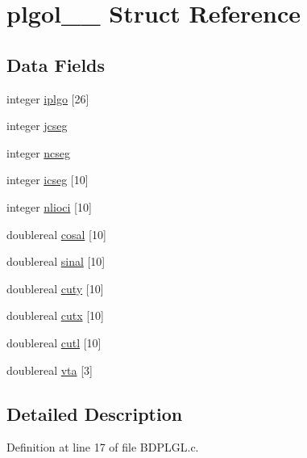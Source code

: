 \hypertarget{structplgol__1__}{}\section{plgol\+\_\+\_\+ Struct Reference}
\label{structplgol__1__}
\subsection*{Data Fields}
\begin{DoxyCompactItemize}
\item 
integer \hyperlink{structplgol__1___a32a2e59eb008ef43088590b0d5d9bad7}{iplgo} \mbox{[}26\mbox{]}
\item 
integer \hyperlink{structplgol__1___aa429c3e8a2db853c48bb7460e34ea585}{jcseg}
\item 
integer \hyperlink{structplgol__1___af13a26e581bc7e4c2933b38cf4f3ad45}{ncseg}
\item 
integer \hyperlink{structplgol__1___a84f8c270e0daa259175f2a20c4a2c7d7}{icseg} \mbox{[}10\mbox{]}
\item 
integer \hyperlink{structplgol__1___a2e768cef3d4a9a2ac95cf6311c633b37}{nlioci} \mbox{[}10\mbox{]}
\item 
doublereal \hyperlink{structplgol__1___aef4f0977532490bdf1d5d453e70f314e}{cosal} \mbox{[}10\mbox{]}
\item 
doublereal \hyperlink{structplgol__1___a024fcf03579dc1c8cd13aa8f83728a12}{sinal} \mbox{[}10\mbox{]}
\item 
doublereal \hyperlink{structplgol__1___af9ce5ba90d0c8fe468443d3ed93257fe}{cuty} \mbox{[}10\mbox{]}
\item 
doublereal \hyperlink{structplgol__1___ade8c1ebd6cfd4ae295b3adbc923a534f}{cutx} \mbox{[}10\mbox{]}
\item 
doublereal \hyperlink{structplgol__1___af1bbaba2ab946442dc54cd18a6e91625}{cutl} \mbox{[}10\mbox{]}
\item 
doublereal \hyperlink{structplgol__1___a7eefeebb364ef819e1f61e128420f96f}{vta} \mbox{[}3\mbox{]}
\end{DoxyCompactItemize}


\subsection{Detailed Description}


Definition at line 17 of file B\+D\+P\+L\+G\+L.\+c.



